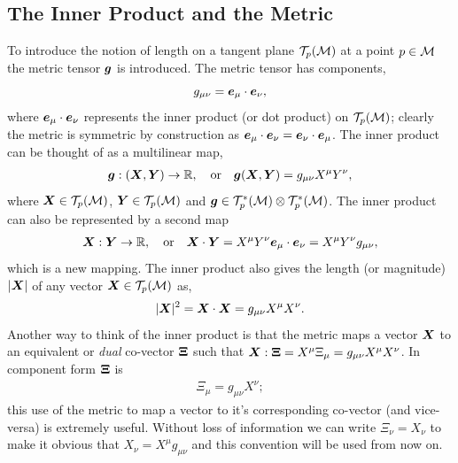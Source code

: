\subsection{The Inner Product and the Metric} \label{intro:sec:dotprod}
To introduce the notion of length on a tangent plane $\mathcal{T}_p(\mathcal{M})$ at a point $p\in\mathcal{M}$ the metric tensor $\boldsymbol{g}$ is introduced. The metric tensor has components, 
\begin{equation}
g_{\mu\nu} = \boldsymbol{e}_\mu \cdot \boldsymbol{e}_\nu,
\end{equation}
where $\boldsymbol{e}_\mu \cdot \boldsymbol{e}_\nu$ represents the inner product (or dot product) on $\mathcal{T}_p(\mathcal{M})$; clearly the metric is symmetric by construction as $\boldsymbol{e}_\mu \cdot \boldsymbol{e}_\nu=\boldsymbol{e}_\nu \cdot \boldsymbol{e}_\mu$. The inner product can be thought of as a multilinear map,
\begin{gather}
\boldsymbol{g} : (\boldsymbol{X} , \boldsymbol{Y}) \rightarrow \mathbb{R} , \quad \mathrm{or} \quad
\boldsymbol{g}(\boldsymbol{X},\boldsymbol{Y}) = g_{\mu\nu} X^\mu Y^\nu,
\end{gather}
where $\boldsymbol{X}\in \mathcal{T}_p(\mathcal{M})$, $\boldsymbol{Y}\in \mathcal{T}_p(\mathcal{M})$ and $\boldsymbol{g}\in \mathcal{T}^*_p(\mathcal{M})\otimes  \mathcal{T}^*_p(\mathcal{M})$. The inner product can also be represented by a second map
\begin{gather}
\boldsymbol{X} : \boldsymbol{Y} \rightarrow \mathbb{R} , \quad \mathrm{or} \quad
\boldsymbol{X} \cdot \boldsymbol{Y} = X^\mu Y^\nu \boldsymbol{e}_\mu \cdot \boldsymbol{e}_\nu = X^\mu Y^\nu g_{\mu\nu},
\end{gather}
which is a new mapping. The inner product also gives the length (or magnitude) $|\boldsymbol{X}|$ of any vector $\boldsymbol{X}\in \mathcal{T}_p(\mathcal{M})$ as,
\begin{equation}
|\boldsymbol{X}|^2 = \boldsymbol{X} \cdot \boldsymbol{X} = g_{\mu\nu}X^\mu X^\nu.
\end{equation}
Another way to think of the inner product is that the metric maps a vector $\boldsymbol{X}$ to an equivalent or {\it dual} co-vector $\boldsymbol{\Xi}$ such that $\boldsymbol{X} : \boldsymbol{\Xi} = X^\mu \Xi_\mu= g_{\mu\nu}X^\mu X^\nu$. In component form $\boldsymbol{\Xi}$ is
\begin{align}
\Xi_\mu = g_{\mu\nu}X^\nu;
\end{align}
this use of the metric to map a vector to it's corresponding co-vector (and vice-versa) is extremely useful. Without loss of information we can write $\Xi_\nu = X_\nu$ to make it obvious that $X_\nu = X^\mu g_{\mu\nu}$ and this convention will be used from now on.

